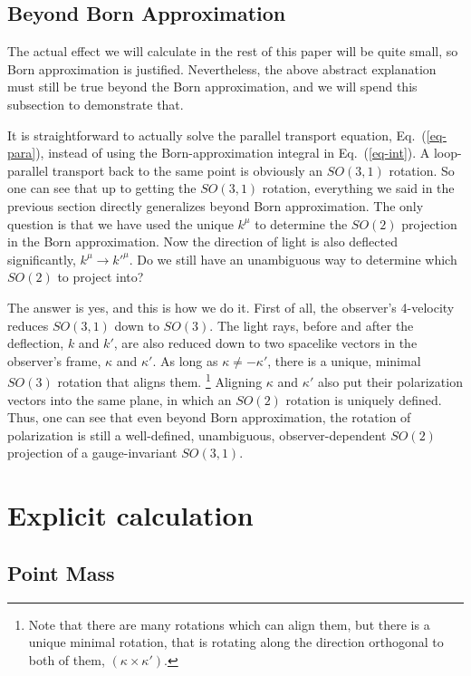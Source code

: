 \documentclass[aps,showpacs,twocolumn,floats,prd,superscriptaddress,nofootinbib]{revtex4}
\begin{document}
\subsection{Beyond Born Approximation}

The actual effect we will calculate in the rest of this paper will be quite small, so Born approximation is justified. 
Nevertheless, the above abstract explanation must still be true beyond the Born approximation, and we will spend this subsection to demonstrate that. 

It is straightforward to actually solve the parallel transport equation, Eq.~(\ref{eq-para}), instead of using the Born-approximation integral in Eq.~(\ref{eq-int}). 
A loop-parallel transport back to the same point is obviously an $SO(3,1)$ rotation.
So one can see that up to getting the $SO(3,1)$ rotation, everything we said in the previous section directly generalizes beyond Born approximation.
The only question is that we have used the unique $k^\mu$ to determine the $SO(2)$ projection in the Born approximation.
Now the direction of light is also deflected significantly, $k^\mu \rightarrow k'^\mu$. 
Do we still have an unambiguous way to determine which $SO(2)$ to project into?

The answer is yes, and this is how we do it. 
First of all, the observer's 4-velocity reduces $SO(3,1)$ down to $SO(3)$.
The light rays, before and after the deflection, $k$ and $k'$, are also reduced down to two spacelike vectors in the observer's frame, $\kappa$ and $\kappa'$.
As long as $\kappa\neq-\kappa'$, there is a unique, minimal $SO(3)$ rotation that aligns them.
\footnote{Note that there are many rotations which can align them, but there is a unique minimal rotation, that is rotating along the direction orthogonal to both of them, $(\kappa\times\kappa')$.}
Aligning $\kappa$ and $\kappa'$ also put their polarization vectors into the same plane, in which an $SO(2)$ rotation is uniquely defined. 
Thus, one can see that even beyond Born approximation, the rotation of polarization is still a well-defined, unambiguous, observer-dependent $SO(2)$ projection of a gauge-invariant $SO(3,1)$.

\section{Explicit calculation}
\label{sec-Sch}

\subsection{Point Mass}
\end{document}
